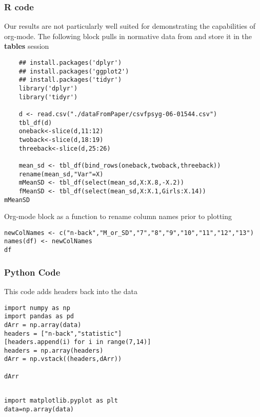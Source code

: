 \documentclass{article}
\begin{document}
\subsubsection{R code}
\label{sec:org5e63440}
Our results are not particularly well suited for demonstrating the capabilities of org-mode. 
The following block pulls in normative data from \cite{NormativeData} and store it in the \textbf{tables} session
\begin{verbatim}
    ## install.packages('dplyr')
    ## install.packages('ggplot2')
    ## install.packages('tidyr')
    library('dplyr')
    library('tidyr')

    d <- read.csv("./dataFromPaper/csvfpsyg-06-01544.csv")
    tbl_df(d)
    oneback<-slice(d,11:12)
    twoback<-slice(d,18:19)
    threeback<-slice(d,25:26)

    mean_sd <- tbl_df(bind_rows(oneback,twoback,threeback))
    rename(mean_sd,"Var"=X)
    mMeanSD <- tbl_df(select(mean_sd,X:X.8,-X.2))
    fMeanSD <- tbl_df(select(mean_sd,X:X.1,Girls:X.14))
mMeanSD

\end{verbatim}

Org-mode block as a function to rename column names prior to plotting
\begin{verbatim}
newColNames <- c("n-back","M_or_SD","7","8","9","10","11","12","13")
names(df) <- newColNames
df
\end{verbatim}










\subsubsection{Python Code}
\label{sec:org60f279b}
This code adds headers back into the data
\begin{verbatim}
import numpy as np
import pandas as pd
dArr = np.array(data)
headers = ["n-back","statistic"]
[headers.append(i) for i in range(7,14)]
headers = np.array(headers)
dArr = np.vstack((headers,dArr))

dArr
\end{verbatim}

\begin{verbatim}

import matplotlib.pyplot as plt
data=np.array(data)


\end{verbatim}
\end{document}
